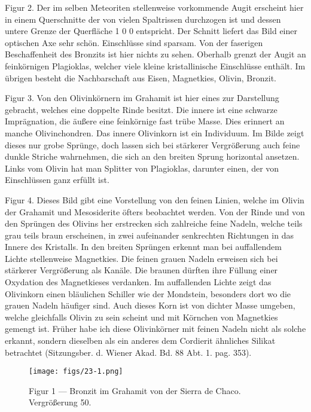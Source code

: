 \documentclass[a4paper, 12pt, oneside]{article}
\begin{document}
Figur 2. Der im selben Meteoriten stellenweise vorkommende Augit erscheint hier in einem Querschnitte der von vielen Spaltrissen durchzogen ist und dessen untere Grenze der Querfläche 1 0 0 entspricht. Der Schnitt liefert das Bild einer optischen Axe sehr schön. Einschlüsse sind sparsam. Von der faserigen Beschaffenheit des Bronzits ist hier nichts zu sehen. Oberhalb grenzt der Augit an feinkörnigen Plagioklas, welcher viele kleine kristallinische Einschlüsse enthält. Im übrigen besteht die Nachbarschaft aus Eisen, Magnetkies, Olivin, Bronzit.

Figur 3. Von den Olivinkörnern im Grahamit ist hier eines zur Darstellung gebracht, welches eine doppelte Rinde besitzt. Die innere ist eine schwarze Imprägnation, die äußere eine feinkörnige fast trübe Masse. Dies erinnert an manche Olivinchondren. Das innere Olivinkorn ist ein Individuum. Im Bilde zeigt dieses nur grobe Sprünge, doch lassen sich bei stärkerer Vergrößerung auch feine dunkle Striche wahrnehmen, die sich an den breiten Sprung horizontal ansetzen. Links vom Olivin hat man Splitter von Plagioklas, darunter einen, der von Einschlüssen ganz erfüllt ist.

Figur 4. Dieses Bild gibt eine Vorstellung von den feinen Linien, welche im Olivin der Grahamit und Mesosiderite öfters beobachtet werden. Von der Rinde und von den Sprüngen des Olivins her erstrecken sich zahlreiche feine Nadeln, welche teils grau teils braun erscheinen, in zwei aufeinander senkrechten Richtungen in das Innere des Kristalls. In den breiten Sprüngen erkennt man bei auffallendem Lichte stellenweise Magnetkies. Die feinen grauen Nadeln erweisen sich bei stärkerer Vergrößerung als Kanäle. Die braunen dürften ihre Füllung einer Oxydation des Magnetkieses verdanken. Im auffallenden Lichte zeigt das Olivinkorn einen bläulichen Schiller wie der Mondstein, besonders dort wo die grauen Nadeln häufiger sind. Auch dieses Korn ist von dichter Masse umgeben, welche gleichfalls Olivin zu sein scheint und mit Körnchen von Magnetkies gemengt ist. Früher habe ich diese Olivinkörner mit feinen Nadeln nicht als solche erkannt, sondern dieselben als ein anderes dem Cordierit ähnliches Silikat betrachtet (Sitzungsber. d. Wiener Akad. Bd. 88 Abt. 1. pag. 353).
\clearpage

\vspace*{\fill}
\begin{figure}[H]
\centering
\texttt{[image: figs/23-1.png]}
\caption{\small Figur 1 --- Bronzit im Grahamit von der Sierra de Chaco. Vergrößerung 50.}
\end{figure}
\vspace*{\fill}
\clearpage
\end{document}
